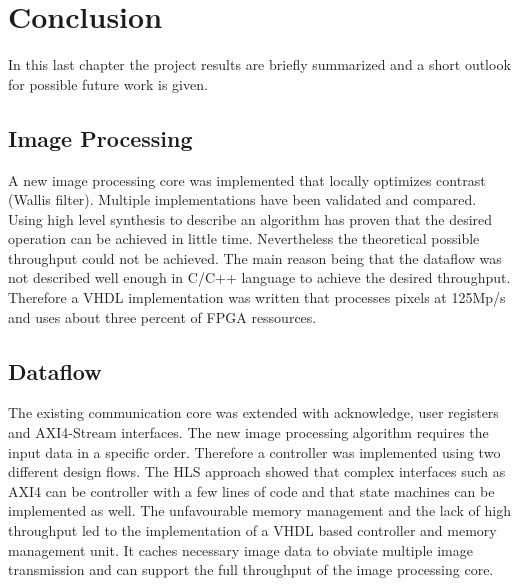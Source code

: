 %
%
\chapter{Conclusion}
In this last chapter the project results are briefly summarized and
a short outlook for possible future work is given.

%
%
\section{Image Processing}
A new image processing core was implemented that locally optimizes contrast 
(Wallis filter). Multiple implementations have been validated and compared.
Using high level synthesis to describe an algorithm has proven that the desired
operation can be achieved in little time. Nevertheless the theoretical possible
throughput could not be achieved. The main reason being that the dataflow was
not described well enough in C/C++ language to achieve the desired throughput.
Therefore a VHDL implementation was written that processes pixels at 125Mp/s and
uses about three percent of FPGA ressources.

%
%
\section{Dataflow}
The existing communication core was extended with acknowledge, user registers
and AXI4-Stream interfaces. The new image processing algorithm requires the
input data in a specific order. Therefore a controller was implemented using two
different design flows. The HLS approach showed that complex interfaces such as
AXI4 can be controller with a few lines of code and that state machines can be
implemented as well. The unfavourable memory management and the lack of high
throughput
led to the implementation of a VHDL based controller and memory management unit.
It caches necessary image data to obviate multiple image transmission and can
support the full throughput of the image processing core.

